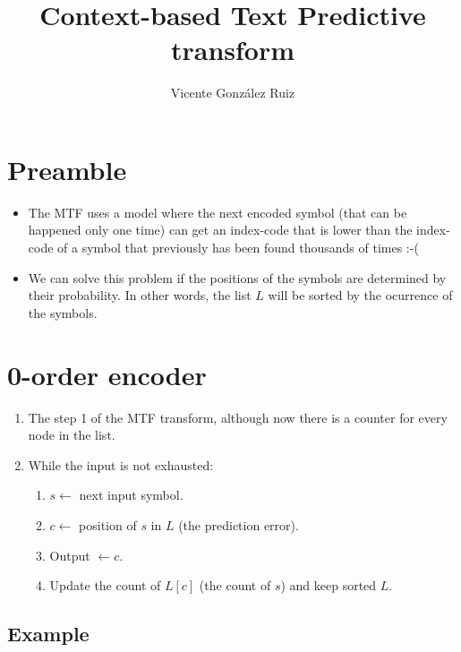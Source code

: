 
\title{Context-based Text Predictive transform}

\author{Vicente González Ruiz}

\maketitle

\section{Preamble}
\begin{itemize}
\item
  The MTF uses a model where the next encoded symbol (that can be
  happened only one time) can get an index-code that is lower than the
  index-code of a symbol that previously has been found thousands of
  times :-(
\item
  We can solve this problem if the positions of the symbols are
  determined by their probability. In other words, the list \(L\) will
  be sorted by the ocurrence of the symbols.
\end{itemize}

\section{0-order encoder}
\begin{enumerate}
\def\labelenumi{\arabic{enumi}.}
\tightlist
\item
  The step 1 of the MTF transform, although now there is a counter for
  every node in the list.
\item
  While the input is not exhausted:
  \begin{enumerate}
  \def\labelenumii{\arabic{enumii}.}
  \tightlist
  \item
    \(s\leftarrow\) next input symbol.
  \item
    \(c\leftarrow\) position of \(s\) in \(L\) (the prediction error).
  \item
    Output \(\leftarrow c\).
  \item
    Update the count of \(L[c]\) (the count of \(s\)) and keep sorted
    \(L\).
  \end{enumerate}
\end{enumerate}

\subsection{Example}

